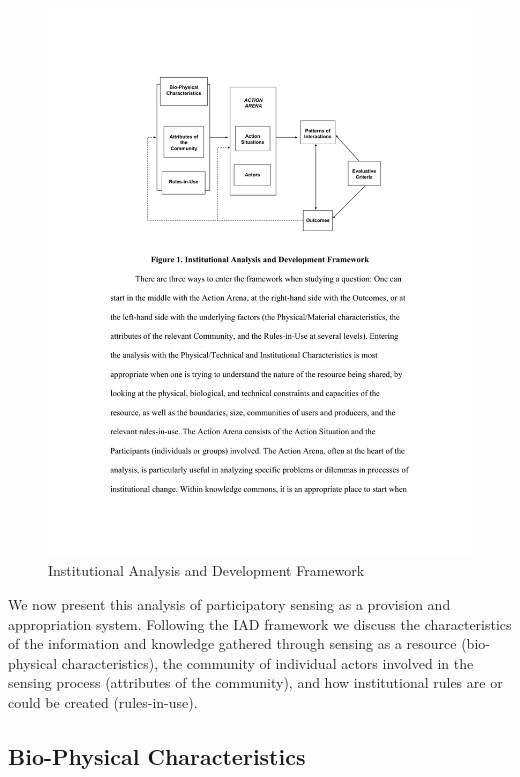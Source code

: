 \begin{figure}
\includegraphics[width=\linewidth]{gfx/IAD.pdf}
\caption[Institutional Analysis and Development Framework]{Institutional Analysis and Development Framework~\protect\cite[p.44]{Ostrom2007a}}\label{fig:iad}
\end{figure}

We now present this analysis of participatory sensing as a provision and appropriation system. 
Following the \ac{IAD} framework we discuss the characteristics of the information and knowledge gathered through sensing as a resource (bio-physical characteristics), the community of individual actors involved in the sensing process (attributes of the community), and how institutional rules are or could be created (rules-in-use).

\subsection{Bio-Physical Characteristics}

